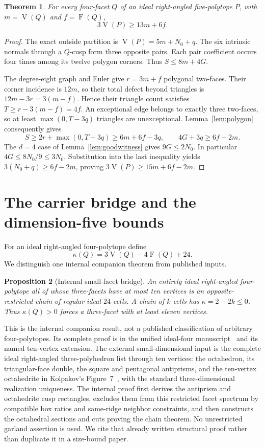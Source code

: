 \documentclass[11pt]{article}
\newtheorem{theorem}{Theorem}[section]
\newtheorem{proposition}[theorem]{Proposition}
\theoremstyle{remark}
\newcommand{\VV}{\operatorname{V}}
\newcommand{\FF}{\operatorname{F}}
\begin{document}
\begin{theorem}\label{thm:fiveprop}
For every four-facet $Q$ of an ideal right-angled five-polytope $P$,
with $m=\VV(Q)$ and $f=\FF(Q)$,
\begin{equation}\label{eq:fiveprop}
 3\VV(P)\ge13m+6f.
\end{equation}
\end{theorem}
\begin{proof}
The exact outside partition is $\VV(P)=5m+N_0+q$.
The six intrinsic normals through a $Q$-cusp form three opposite
pairs. Each pair coefficient occurs four times among its twelve
polygon corners. Thus $S\le8m+4G$.

The degree-eight graph and Euler give $r=3m+f$ polygonal two-faces.
Their corner incidence is $12m$, so their total defect beyond
triangles is $12m-3r=3(m-f)$. Hence their triangle count satisfies
$T\ge r-3(m-f)=4f$. An exceptional edge belongs to exactly three
two-faces, so at least $\max(0,T-3q)$ triangles are unexceptional.
Lemma~\ref{lem:polygon} consequently gives
\[
 S\ge2r+\max(0,T-3q)\ge6m+6f-3q,
 \qquad 4G+3q\ge6f-2m.
\]
The $d=4$ case of Lemma~\ref{lem:goodwitness} gives $9G\le2N_0$.
In particular $4G\le8N_0/9\le3N_0$. Substitution into the last
inequality yields $3(N_0+q)\ge6f-2m$, proving
$3\VV(P)\ge15m+6f-2m$.
\end{proof}

\section{The carrier bridge and the dimension-five bounds}\label{sec:carrier}

For an ideal right-angled four-polytope define
\[
 \kappa(Q)=3\VV(Q)-4\FF(Q)+24.
\]
We distinguish one internal companion theorem from published inputs.

\begin{proposition}[Internal small-facet bridge]\label{prop:bridge}
An entirely ideal right-angled four-polytope all of whose three-facets
have at most ten vertices is an opposite-restricted chain of regular
ideal $24$-cells. A chain of $k$ cells has $\kappa=2-2k\le0$.
Thus $\kappa(Q)>0$ forces a three-facet with at least eleven vertices.
\end{proposition}

This is the internal companion result, not a published classification of
arbitrary four-polytopes. Its complete proof is in the unified ideal-four
manuscript~\cite{Internal4} and its named ten-vertex extension.
The external small-dimensional input is the complete ideal right-angled
three-polyhedron list through ten vertices: the octahedron, its
triangular-face double, the square and pentagonal antiprisms, and the
ten-vertex octahedrite in Kolpakov's Figure~7~\cite{K}, with the standard
three-dimensional realization uniqueness. The internal proof first
derives the antiprism and octahedrite cusp rectangles, excludes them
from this restricted facet spectrum by compatible box ratios and
same-ridge neighbor constraints, and then constructs the octahedral
sections and cuts proving the chain theorem. No unrestricted garland
assertion is used. We cite that already written structural proof rather
than duplicate it in a size-bound paper.
\end{document}
